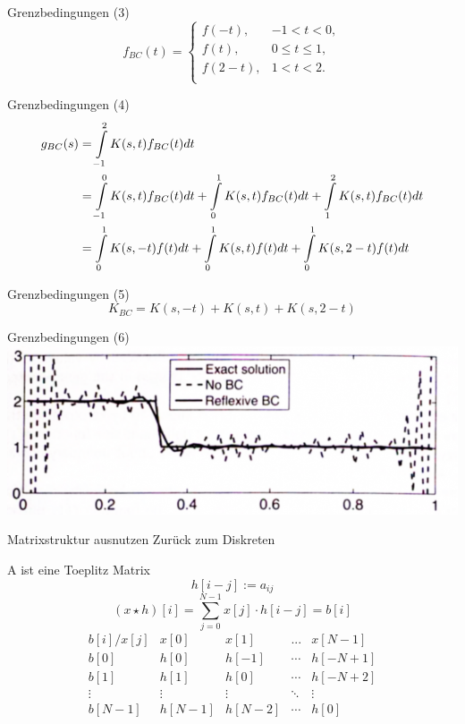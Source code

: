\documentclass[11pt]{beamer}
\begin{document}
\begin{frame}{Grenzbedingungen (3)}
\[
f_{BC}(t) = \begin{cases}
f(-t), & -1 < t < 0,\\
f(t),  & 0 \leq t \leq 1,\\
f(2-t),& 1 < t < 2.\\
\end{cases}
\]
\end{frame}


\begin{frame}{Grenzbedingungen (4)}
\begin{align}
g_{BC}(s) & = \int\limits_{-1}^2 K(s,  t) f_{BC}(t) dt \notag \\
          & = \int\limits_{-1}^0 K(s,  t) f_{BC}(t) dt
            + \int\limits_{ 0}^1 K(s,  t) f_{BC}(t) dt
            + \int\limits_{ 1}^2 K(s,  t) f_{BC}(t) dt \notag \\
          & = \int\limits_{ 0}^1 K(s, -t) f     (t) dt
            + \int\limits_{ 0}^1 K(s,  t) f     (t) dt
            + \int\limits_{0 }^1 K(s,2-t) f     (t) dt \notag
\end{align}
\end{frame}


\begin{frame}{Grenzbedingungen (5)}
 \[K_{BC} = K(s, -t) + K(s,  t) + K(s, 2-t)\]
\end{frame}


\begin{frame}{Grenzbedingungen (6)}
\includegraphics[scale=0.38]{boundary_conditions} 
\end{frame}


\begin{frame}{Matrixstruktur ausnutzen}
Zurück zum Diskreten 
\end{frame}


\begin{frame}{A ist eine Toeplitz Matrix}
\[
h[i-j] := a_{ij}
\]
\[
(x \star h)[i] = \sum\limits_{j=0}^{N-1} x[j] \cdot h[i-j] = b[i]
\]
\[
\begin{array}{c|cccc}
b[i]/x[j] & x[0] & x[1] & ... & x[N-1]  \\
\hline
b[0]     & h[0] & h[-1] & \cdots & h[-N+1] \\
b[1]     & h[1] & h[0] & \cdots & h[-N+2]  \\
\vdots  & \vdots & \vdots & \ddots & \vdots \\
b[N-1] & h[N-1] & h[N-2] & \cdots & h[0]  \\
\end{array}
\]
\end{frame}
\end{document}

